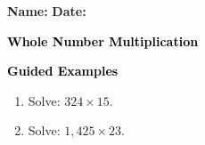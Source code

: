 \documentclass[12pt, letterpaper, fleqn]{article}
\begin{document}
\textbf{Name:} \underline{\hspace{5cm}}
\hfill
\textbf{Date:} \underline{\hspace{3cm}}\\

\begin{tcolorbox}[colback=customteal!20]
    \large\textcolor{black}{\textbf{Whole Number Multiplication}}
\end{tcolorbox}
\newpage
\begin{tcolorbox}[colback=customteal!20]
    \large\textcolor{black}{\textbf{Guided Examples}}
\end{tcolorbox}
\begin{enumerate}[itemsep=3.5cm, leftmargin=0.6cm]
\item Solve: $324 \times 15$.
\vspace{3cm}
\item Solve: $1,425 \times 23$.
\end{enumerate}
\end{document}
